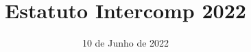 \documentclass[11pt]{report}
\title{Estatuto Intercomp 2022}
\date{10 de Junho de 2022}
\begin{document}





\noindent
\tableofcontents
\newpage














\end{document}
